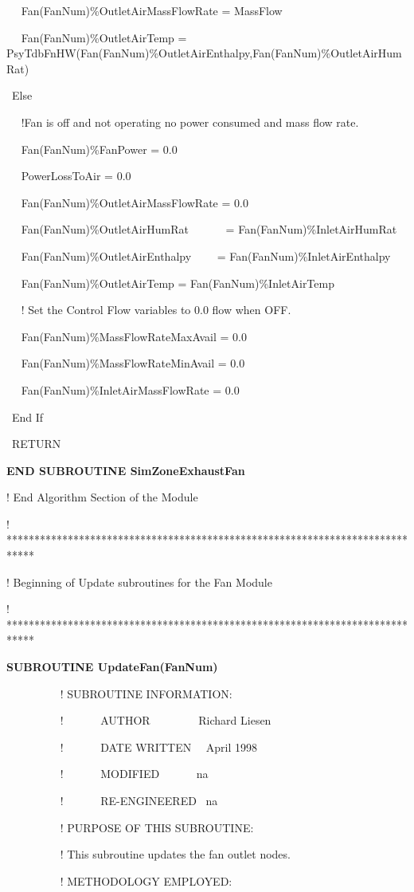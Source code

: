 ~~ Fan(FanNum)\%OutletAirMassFlowRate = MassFlow

~~ Fan(FanNum)\%OutletAirTemp = PsyTdbFnHW(Fan(FanNum)\%OutletAirEnthalpy,Fan(FanNum)\%OutletAirHumRat)

~Else

~~ !Fan is off and not operating no power consumed and mass flow rate.

~~ Fan(FanNum)\%FanPower = 0.0

~~ PowerLossToAir = 0.0

~~ Fan(FanNum)\%OutletAirMassFlowRate = 0.0

~~ Fan(FanNum)\%OutletAirHumRat~~~~~~ = Fan(FanNum)\%InletAirHumRat

~~ Fan(FanNum)\%OutletAirEnthalpy~~~~ = Fan(FanNum)\%InletAirEnthalpy

~~ Fan(FanNum)\%OutletAirTemp = Fan(FanNum)\%InletAirTemp

~~ ! Set the Control Flow variables to 0.0 flow when OFF.

~~ Fan(FanNum)\%MassFlowRateMaxAvail = 0.0

~~ Fan(FanNum)\%MassFlowRateMinAvail = 0.0

~~ Fan(FanNum)\%InletAirMassFlowRate = 0.0

~End If

~RETURN

\textbf{END SUBROUTINE SimZoneExhaustFan}

! End Algorithm Section of the Module

! *****************************************************************************

! Beginning of Update subroutines for the Fan Module

! *****************************************************************************

\textbf{SUBROUTINE UpdateFan(FanNum)}

~~~~~~~~~ ! SUBROUTINE INFORMATION:

~~~~~~~~~ !~~~~~~ AUTHOR~~~~~~~~ Richard Liesen

~~~~~~~~~ !~~~~~~ DATE WRITTEN~~ April 1998

~~~~~~~~~ !~~~~~~ MODIFIED~~~~~~ na

~~~~~~~~~ !~~~~~~ RE-ENGINEERED~ na

~~~~~~~~~ ! PURPOSE OF THIS SUBROUTINE:

~~~~~~~~~ ! This subroutine updates the fan outlet nodes.

~~~~~~~~~ ! METHODOLOGY EMPLOYED:


